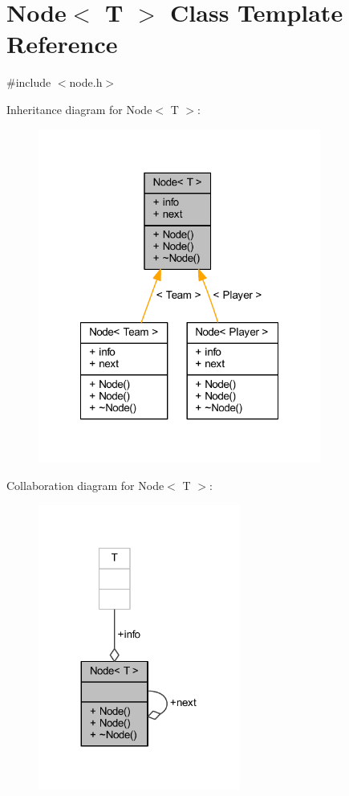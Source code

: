 \hypertarget{class_node}{}\section{Node$<$ T $>$ Class Template Reference}
\label{class_node}


{\ttfamily \#include $<$node.\+h$>$}



Inheritance diagram for Node$<$ T $>$\+:
\nopagebreak
\begin{figure}[H]
\begin{center}
\leavevmode
\includegraphics[width=263pt]{d4/db9/class_node__inherit__graph}
\end{center}
\end{figure}


Collaboration diagram for Node$<$ T $>$\+:
\nopagebreak
\begin{figure}[H]
\begin{center}
\leavevmode
\includegraphics[width=188pt]{d5/dbd/class_node__coll__graph}
\end{center}
\end{figure}
